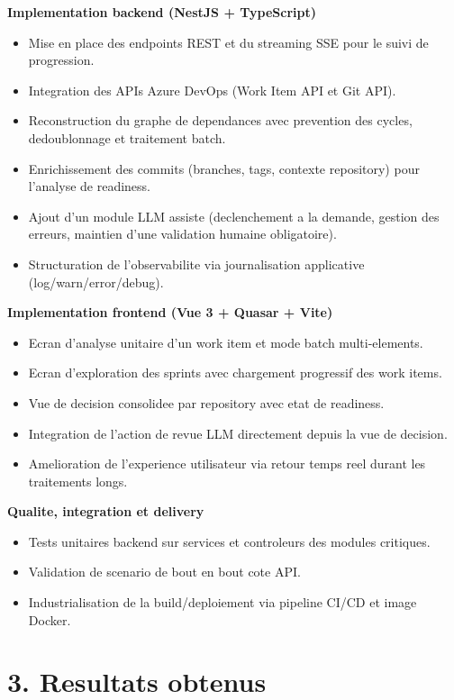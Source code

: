 \textbf{Implementation backend (NestJS + TypeScript)}
\begin{itemize}
  \item Mise en place des endpoints REST et du streaming SSE pour le suivi de
  progression.
  \item Integration des APIs Azure DevOps (Work Item API et Git API).
  \item Reconstruction du graphe de dependances avec prevention des cycles,
  dedoublonnage et traitement batch.
  \item Enrichissement des commits (branches, tags, contexte repository) pour
  l'analyse de readiness.
  \item Ajout d'un module LLM assiste (declenchement a la demande, gestion des
  erreurs, maintien d'une validation humaine obligatoire).
  \item Structuration de l'observabilite via journalisation applicative
  (log/warn/error/debug).
\end{itemize}

\textbf{Implementation frontend (Vue 3 + Quasar + Vite)}
\begin{itemize}
  \item Ecran d'analyse unitaire d'un work item et mode batch multi-elements.
  \item Ecran d'exploration des sprints avec chargement progressif des work
  items.
  \item Vue de decision consolidee par repository avec etat de readiness.
  \item Integration de l'action de revue LLM directement depuis la vue de
  decision.
  \item Amelioration de l'experience utilisateur via retour temps reel durant
  les traitements longs.
\end{itemize}

\textbf{Qualite, integration et delivery}
\begin{itemize}
  \item Tests unitaires backend sur services et controleurs des modules
  critiques.
  \item Validation de scenario de bout en bout cote API.
  \item Industrialisation de la build/deploiement via pipeline CI/CD et image
  Docker.
\end{itemize}

\section*{3. Resultats obtenus}

